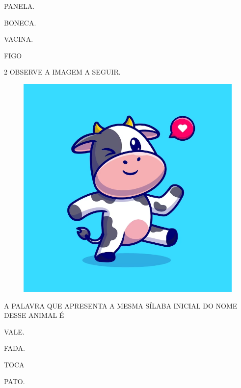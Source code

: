 \begin{escolha}
\item PANELA.

\item BONECA.

\item VACINA.

\item FIGO

\end{escolha}

\num{2} OBSERVE A IMAGEM A SEGUIR.

\begin{figure}[H]
\centering
\includegraphics[width=\textwidth]{./media/image222.png}
\end{figure}

A PALAVRA QUE APRESENTA A MESMA SÍLABA INICIAL DO NOME DESSE ANIMAL É

\begin{escolha}
\item VALE.

\item FADA.

\item TOCA

\item PATO.

\end{escolha}

